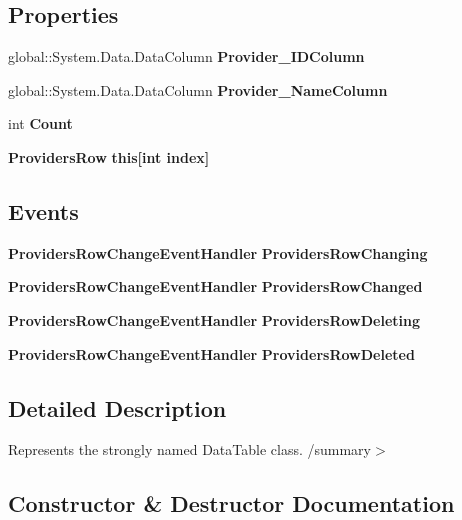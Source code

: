 \subsection*{Properties}
\begin{DoxyCompactItemize}
\item 
global\+::\+System.\+Data.\+Data\+Column \textbf{ Provider\+\_\+\+I\+D\+Column}\hspace{0.3cm}{\ttfamily  [get]}
\item 
global\+::\+System.\+Data.\+Data\+Column \textbf{ Provider\+\_\+\+Name\+Column}\hspace{0.3cm}{\ttfamily  [get]}
\item 
int \textbf{ Count}\hspace{0.3cm}{\ttfamily  [get]}
\item 
\textbf{ Providers\+Row} \textbf{ this[int index]}\hspace{0.3cm}{\ttfamily  [get]}
\end{DoxyCompactItemize}
\subsection*{Events}
\begin{DoxyCompactItemize}
\item 
\textbf{ Providers\+Row\+Change\+Event\+Handler} \textbf{ Providers\+Row\+Changing}
\item 
\textbf{ Providers\+Row\+Change\+Event\+Handler} \textbf{ Providers\+Row\+Changed}
\item 
\textbf{ Providers\+Row\+Change\+Event\+Handler} \textbf{ Providers\+Row\+Deleting}
\item 
\textbf{ Providers\+Row\+Change\+Event\+Handler} \textbf{ Providers\+Row\+Deleted}
\end{DoxyCompactItemize}


\subsection{Detailed Description}
Represents the strongly named Data\+Table class. /summary$>$ 

\subsection{Constructor \& Destructor Documentation}
\mbox{\label{class_a_f_h___scheduler_1_1_home_inspection_data_set_1_1_providers_data_table_a46400b5aa19f8c6264a69302ec4a9a69}} 
